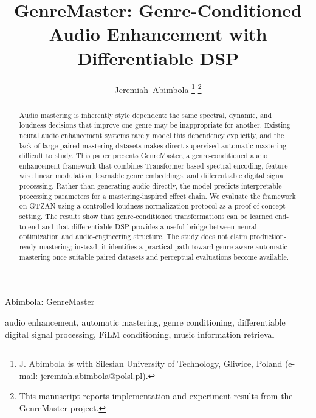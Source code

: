 \documentclass[journal]{IEEEtran}
\begin{document}
\title{GenreMaster: Genre-Conditioned Audio Enhancement with Differentiable DSP}

\author{Jeremiah~Abimbola%
\thanks{J. Abimbola is with Silesian University of Technology, Gliwice, Poland (e-mail: jeremiah.abimbola@polsl.pl).}%
\thanks{This manuscript reports implementation and experiment results from the GenreMaster project.}}

%
{Abimbola: GenreMaster}

\maketitle

\begin{abstract}
Audio mastering is inherently style dependent: the same spectral, dynamic, and loudness decisions that improve one genre may be inappropriate for another. Existing neural audio enhancement systems rarely model this dependency explicitly, and the lack of large paired mastering datasets makes direct supervised automatic mastering difficult to study. This paper presents GenreMaster, a genre-conditioned audio enhancement framework that combines Transformer-based spectral encoding, feature-wise linear modulation, learnable genre embeddings, and differentiable digital signal processing. Rather than generating audio directly, the model predicts interpretable processing parameters for a mastering-inspired effect chain. We evaluate the framework on GTZAN using a controlled loudness-normalization protocol as a proof-of-concept setting. The results show that genre-conditioned transformations can be learned end-to-end and that differentiable DSP provides a useful bridge between neural optimization and audio-engineering structure. The study does not claim production-ready mastering; instead, it identifies a practical path toward genre-aware automatic mastering once suitable paired datasets and perceptual evaluations become available.
\end{abstract}

\begin{IEEEkeywords}
audio enhancement, automatic mastering, genre conditioning, differentiable digital signal processing, FiLM conditioning, music information retrieval
\end{IEEEkeywords}
\end{document}
